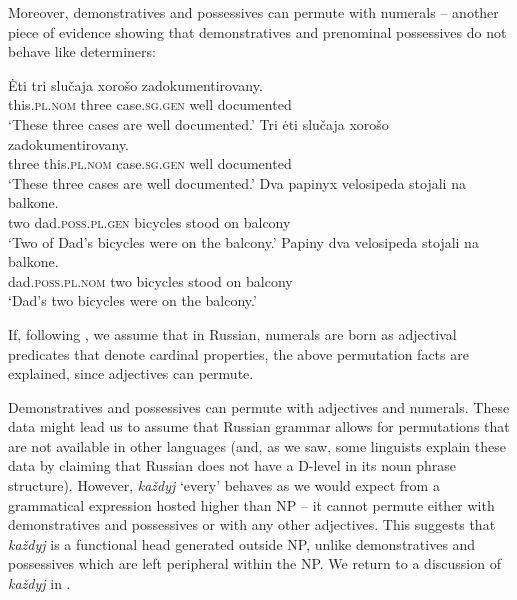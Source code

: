 \documentclass[output=paper]{langscibook}
\begin{document}
Moreover, demonstratives and possessives can permute with numerals -- another piece of evidence showing that demonstratives and prenominal possessives do not behave like determiners:


\ea
    \ea \gll Ėti tri slučaja xorošo zadokumentirovany.\\
    this.\textsc{pl.nom} three case.\textsc{sg.gen} well documented\\
    \glt `These three cases are well documented.'
    \ex \gll Tri ėti slučaja xorošo zadokumentirovany.\\
    three this.\textsc{pl.nom} case.\textsc{sg.gen} well documented\\
    \glt `These three cases are well documented.'
\z\ex
    \ea \gll Dva papinyx velosipeda stojali na balkone.\\
    two dad.\textsc{poss.pl.gen} bicycles stood on balcony\\
    \glt `Two of Dad's bicycles were on the balcony.'
    \ex \gll Papiny dva velosipeda stojali na balkone.\\
    dad.\textsc{poss.pl.nom} two bicycles stood on balcony\\
    \glt `Dad's two bicycles were on the balcony.'
\z\z

\noindent If, following \citet{Khrizman2016}, we assume that in Russian, numerals are born as adjectival predicates that denote cardinal properties, the above permutation facts are explained, since adjectives can permute.

Demonstratives and possessives can permute with adjectives and numerals. These data might lead us to assume that Russian grammar allows for permutations that are not available in other languages (and, as we saw, some linguists explain these data by claiming that Russian does not have a D-level in its noun phrase structure). However, \textit{každyj} `every' behaves as we would expect from a grammatical expression hosted higher than NP -- it cannot permute either with demonstratives and possessives or with any other adjectives. This suggests that \textit{každyj} is a functional head generated outside NP, unlike demonstratives and possessives which are left peripheral within the NP. We return to a discussion of \textit{každyj} in .


\ea
\z\z
\end{document}
